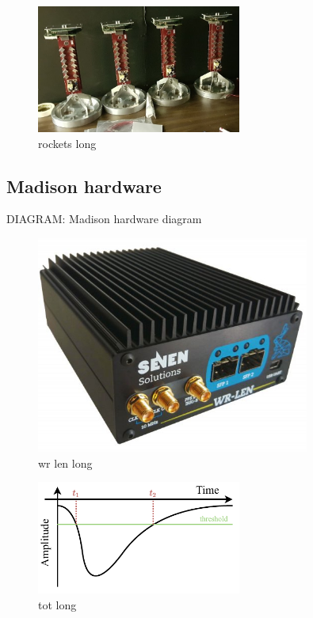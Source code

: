 \begin{figure} %
    \includegraphics[width=0.6\textwidth]{diagrams/5-daq/rockets.jpg}
    \caption[rockets short]
    {rockets long}
    \label{fig:rockets}
\end{figure}

\subsection{Madison hardware} %
\label{sec:daq_hard_madison} %

DIAGRAM: Madison hardware diagram

\begin{figure} %
    \includegraphics[width=0.8\textwidth]{diagrams/5-daq/wr_len.jpg}
    \caption[wr len short]
    {wr len long}
    \label{fig:wr_len}
\end{figure}

\begin{figure} %
    \includegraphics[width=0.6\textwidth]{diagrams/5-daq/tot.pdf}
    \caption[tot short]
    {tot long}
    \label{fig:tot}
\end{figure}

